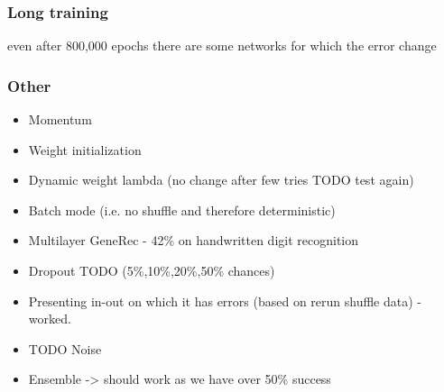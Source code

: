 
  
\subsubsection{Long training} 
even after 800,000 epochs there are some networks for which the error change

\subsubsection{Other} 
\begin{itemize} 
\item Momentum
\item Weight initialization 
\item Dynamic weight lambda (no change after few tries TODO test again) 
\item Batch mode (i.e. no shuffle and therefore deterministic)
\item Multilayer GeneRec - 42\% on handwritten digit recognition 
\item Dropout TODO (5\%,10\%,20\%,50\% chances)
\item Presenting in-out on which it has errors (based on rerun shuffle data) - worked. 
\item TODO Noise 
\item Ensemble -> should work as we have over 50\% success
\end{itemize} 


